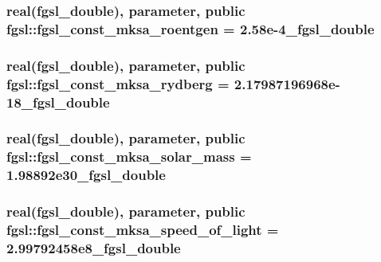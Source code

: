 \subsubsection[{fgsl\+\_\+const\+\_\+mksa\+\_\+roentgen}]{\setlength{\rightskip}{0pt plus 5cm}real({\bf fgsl\+\_\+double}), parameter, public fgsl\+::fgsl\+\_\+const\+\_\+mksa\+\_\+roentgen = 2.\+58e-\/4\+\_\+fgsl\+\_\+double}\label{namespacefgsl_a0b3f21e2d3493c6d7662dbe77ab1fbe6}
\hypertarget{namespacefgsl_a06f564b1101469e9756b3bb20be06b16}{}
\subsubsection[{fgsl\+\_\+const\+\_\+mksa\+\_\+rydberg}]{\setlength{\rightskip}{0pt plus 5cm}real({\bf fgsl\+\_\+double}), parameter, public fgsl\+::fgsl\+\_\+const\+\_\+mksa\+\_\+rydberg = 2.\+17987196968e-\/18\+\_\+fgsl\+\_\+double}\label{namespacefgsl_a06f564b1101469e9756b3bb20be06b16}
\hypertarget{namespacefgsl_accd84d0687faa8d8009cb69525c2c81d}{}
\subsubsection[{fgsl\+\_\+const\+\_\+mksa\+\_\+solar\+\_\+mass}]{\setlength{\rightskip}{0pt plus 5cm}real({\bf fgsl\+\_\+double}), parameter, public fgsl\+::fgsl\+\_\+const\+\_\+mksa\+\_\+solar\+\_\+mass = 1.\+98892e30\+\_\+fgsl\+\_\+double}\label{namespacefgsl_accd84d0687faa8d8009cb69525c2c81d}
\hypertarget{namespacefgsl_a3d8ceae8504f8bd508cbd8865e1ba1b8}{}
\subsubsection[{fgsl\+\_\+const\+\_\+mksa\+\_\+speed\+\_\+of\+\_\+light}]{\setlength{\rightskip}{0pt plus 5cm}real({\bf fgsl\+\_\+double}), parameter, public fgsl\+::fgsl\+\_\+const\+\_\+mksa\+\_\+speed\+\_\+of\+\_\+light = 2.\+99792458e8\+\_\+fgsl\+\_\+double}\label{namespacefgsl_a3d8ceae8504f8bd508cbd8865e1ba1b8}
\hypertarget{namespacefgsl_a43547e219346197d5b5b8c6adff614eb}{}
